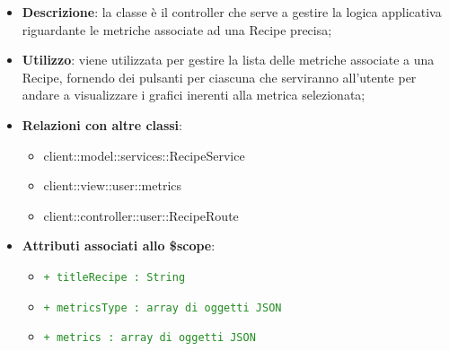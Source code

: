 			\begin{itemize}
				\item \textbf{Descrizione}: la classe è il controller che serve a gestire la logica applicativa riguardante le metriche associate ad una Recipe precisa;
				\item \textbf{Utilizzo}: viene utilizzata per gestire la lista delle metriche associate a una Recipe, fornendo dei pulsanti per ciascuna che serviranno all'utente per andare a visualizzare i grafici inerenti alla metrica selezionata;
				\item \textbf{Relazioni con altre classi}:
					\begin{itemize}
						\item client::model::services::RecipeService
						\item client::view::user::metrics
						\item client::controller::user::RecipeRoute
					\end{itemize}

				\item \textbf{Attributi associati allo \$scope}:
					\begin{itemize}
						\item \textcolor{forestgreen}{\texttt{+ titleRecipe : String}}
						\item \textcolor{forestgreen}{\texttt{+ metricsType : array di oggetti JSON}}
						\item \textcolor{forestgreen}{\texttt{+ metrics : array di oggetti JSON}}


\end{itemize}
\end{itemize}
